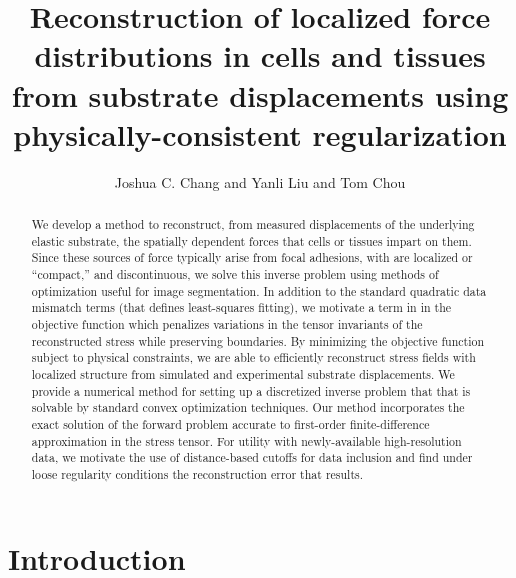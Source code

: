 \documentclass[aps,prl,reprint,twocolumn,groupedaddress,showpacs]{revtex4-1}
\begin{document}
\title{Reconstruction of localized force distributions in cells and tissues from substrate displacements using physically-consistent regularization}

\author{Joshua C. Chang and Yanli Liu and Tom Chou} 






\begin{abstract}
We develop a method to reconstruct, from measured displacements of the
underlying elastic substrate, the spatially dependent forces that
cells or tissues impart on them. Since these sources of force
typically arise from focal adhesions, with are localized or
``compact,'' and discontinuous, we solve this inverse problem using
methods of optimization useful for image segmentation. In addition to
the standard quadratic data mismatch terms (that defines least-squares
fitting), we motivate a term in in the objective function which
penalizes variations in the tensor invariants of the reconstructed stress while
preserving boundaries.   By minimizing
the objective function subject to physical constraints, we are able to
efficiently reconstruct stress fields with localized structure from
simulated and experimental substrate displacements. We provide a
numerical method for setting up a discretized inverse problem that that
 is solvable by standard convex optimization techniques. Our method incorporates
the exact solution of the forward problem accurate to first-order finite-difference approximation
in the stress tensor. For utility with newly-available high-resolution data, we motivate
the use of distance-based cutoffs for data inclusion and find under loose regularity
conditions the reconstruction error that results.
\end{abstract}
\maketitle

\section{Introduction}
\end{document}

